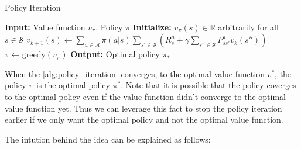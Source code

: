 \begin{algorithm}[H]
    \caption{Policy Iteration}
    \label{alg:policy_iteration}
    \begin{algorithmic}[1]
        \State \textbf{Input:} Value function $v_{\pi}$, Policy $\pi$
        \State \textbf{Initialize:} $v_{\pi}(s) \in \mathbb{R}$ arbitrarily for all $s \in \mathcal{S}$
                \State $v_{k+1}(s) \leftarrow \sum\limits_{a \in \mathcal{A}} 
                    \pi(a|s) \sum\limits_{s' \in \mathcal{S}} 
                    \left( 
                        R_{s}^{a} + \gamma \sum\limits_{s'' \in \mathcal{S}}
                        P_{ss'}^{a} v_{k}(s'')   
                     \right)$
                \State $\pi \leftarrow \text{greedy}(v_{\pi})$
            \EndFor
        \EndWhile
        \State \textbf{Output:} Optimal policy $\pi_{*}$
    \end{algorithmic}
\end{algorithm}

When the \autoref{alg:policy_iteration} converges, 
to the optimal value function \(v^{*}\), the policy \(\pi\) is the optimal policy \(\pi^{*}\).
Note that it is possible that the policy coverges to the optimal policy even if the value function
didn't converge to the optimal value function yet. Thus we can leverage this fact to stop the
policy iteration earlier if we only want the optimal policy and not the optimal value function.


The intution behind the idea can be explained as follows:


